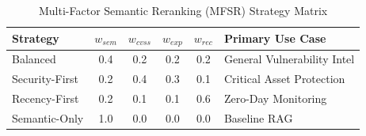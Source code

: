 \begin{table}[htbp]
\caption{Multi-Factor Semantic Reranking (MFSR) Strategy Matrix}
\label{tab:strategies}
\begin{center}
\begin{tabular}{@{}lccccp{2.5cm}@{}}
\toprule
\textbf{Strategy} & $w_{sem}$ & $w_{cvss}$ & $w_{exp}$ & $w_{rec}$ & \textbf{Primary Use Case} \\ \midrule
Balanced & 0.4 & 0.2 & 0.2 & 0.2 & General Vulnerability Intel \\
Security-First & 0.2 & 0.4 & 0.3 & 0.1 & Critical Asset Protection \\
Recency-First & 0.2 & 0.1 & 0.1 & 0.6 & Zero-Day Monitoring \\
Semantic-Only & 1.0 & 0.0 & 0.0 & 0.0 & Baseline RAG \\ \bottomrule
\end{tabular}
\end{center}
\end{table}
